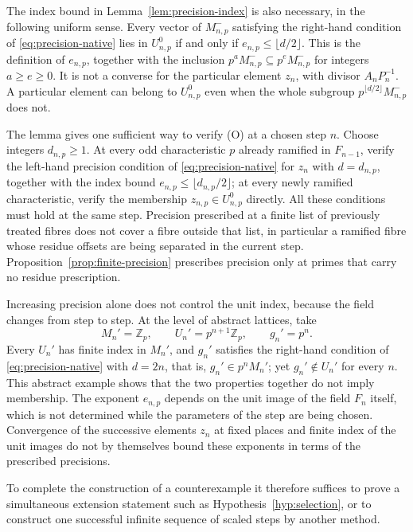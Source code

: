 \documentclass[11pt]{article}
\theoremstyle{plain}
\theoremstyle{definition}
\theoremstyle{remark}
\newcommand{\Z}{\mathbb Z}
\begin{document}
The index bound in Lemma~\ref{lem:precision-index} is also necessary, in
the following uniform sense.  Every vector of $M_{n,p}^-$ satisfying the
right-hand condition of \eqref{eq:precision-native} lies in $U^0_{n,p}$
if and only if $e_{n,p}\le\lfloor d/2\rfloor$.  This is the definition of
$e_{n,p}$, together with the inclusion $p^{a}M_{n,p}^-\subseteq
p^{e}M_{n,p}^-$ for integers $a\ge e\ge0$.  It is not a converse for the particular
element $z_n$, with divisor $A_nP_n^{-1}$.  A particular element can
belong to $U_{n,p}^0$ even when the whole subgroup
$p^{\lfloor d/2\rfloor}M_{n,p}^-$ does not.

The lemma gives one sufficient way to verify (O) at a chosen step $n$.
Choose integers $d_{n,p}\ge1$.  At every odd characteristic $p$ already
ramified in $F_{n-1}$, verify the left-hand precision condition of
\eqref{eq:precision-native} for $z_n$ with $d=d_{n,p}$, together with the
index bound $e_{n,p}\le\lfloor d_{n,p}/2\rfloor$; at every newly ramified
characteristic, verify the membership $z_{n,p}\in U^0_{n,p}$ directly.
All these conditions must hold at the same step.  Precision prescribed at
a finite list of previously treated fibres does not cover a fibre outside
that list, in particular a ramified fibre whose residue offsets are being
separated in the current step.  Proposition~\ref{prop:finite-precision}
prescribes precision only at primes that carry no residue prescription.

Increasing precision alone does not control the unit index, because the
field changes from step to step.  At the level of abstract lattices, take
\[
 M_n'=\Z_p,\qquad U_n'=p^{n+1}\Z_p,\qquad g_n'=p^n.
\]
Every $U_n'$ has finite index in $M_n'$, and $g_n'$ satisfies the
right-hand condition of \eqref{eq:precision-native} with $d=2n$, that is,
$g_n'\in p^nM_n'$; yet $g_n'\notin U_n'$ for every $n$.  This abstract
example shows that the two properties together do not imply membership.  The exponent $e_{n,p}$ depends on
the unit image of the field $F_n$ itself, which is not determined while
the parameters of the step are being chosen.  Convergence of the
successive elements $z_n$ at fixed places and finite index of the unit
images do not by themselves bound these exponents in terms of the
prescribed precisions.

To complete the construction of a counterexample it therefore suffices to
prove a simultaneous extension statement such as
Hypothesis~\ref{hyp:selection}, or to construct one successful infinite
sequence of scaled steps by another method.
\end{document}
